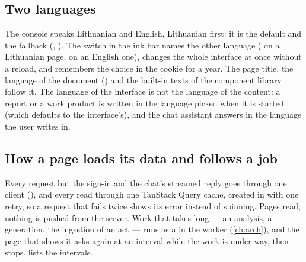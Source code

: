 \subsection{Two languages}\label{sec:console:lang}

The console speaks Lithuanian and English, Lithuanian first: it is the default and the
fallback (, ). The switch in the ink bar names the
other language ( on a Lithuanian page,  on an English one), changes
the whole interface at once without a reload, and remembers the choice in the 
cookie for a year. The page title, the language of the document () and the
built-in texts of the component library follow it. The language of the interface is not the
language of the content: a report or a work product is written in the language picked when it
is started (which defaults to the interface's), and the chat assistant answers in the language
the user writes in.

\subsection{How a page loads its data and follows a job}\label{sec:console:data}

Every request but the sign-in and the chat's streamed reply goes through one client
(), and every read through one
TanStack Query cache, created in  with one retry, so a request that fails twice
shows its error instead of spinning. Pages read; nothing is pushed from the server. Work that
takes long --- an analysis, a generation, the ingestion of an act --- runs as a  in
the worker (\cref{ch:arch}), and the page that shows it asks again at an interval while the
work is under way, then stops.  lists the intervals.

